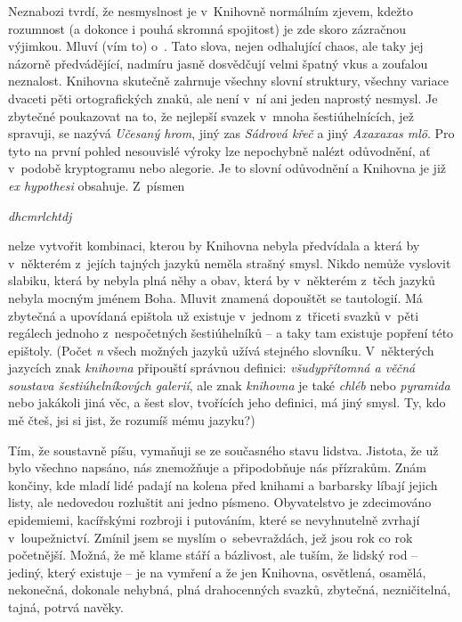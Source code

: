 \documentclass[11pt]{article}
\begin{document}
Neznabozi tvrdí, že nesmyslnost je v~Knihovně normálním zjevem, kdežto rozumnost (a dokonce i pouhá skromná spojitost) je zde skoro zázračnou výjimkou. Mluví (vím to) o~. Tato slova, nejen odhalující chaos, ale taky jej názorně předvádějící, nadmíru jasně dosvědčují velmi špatný vkus a zoufalou neznalost. Knihovna skutečně zahrnuje všechny slovní struktury, všechny variace dvaceti pěti ortografických znaků, ale není v~ní ani jeden naprostý nesmysl. Je zbytečné poukazovat na to, že nejlepší svazek v~mnoha šestiúhelnících, jež spravuji, se nazývá \textit{Učesaný hrom}, jiný zas \textit{Sádrová křeč} a jiný \textit{Axaxaxas mlö}. Pro tyto na první pohled nesouvislé výroky lze nepochybně nalézt odůvodnění, ať v~podobě kryptogramu nebo alegorie. Je to slovní odůvodnění a Knihovna je již \textit{ex hypothesi} obsahuje. Z~písmen
\begin{center}
\textit{dhcmrlchtdj}
\end{center}
\noindent
nelze vytvořit kombinaci, kterou by Knihovna nebyla předvídala a která by v~některém z~jejích tajných jazyků neměla strašný smysl. Nikdo nemůže vyslovit slabiku, která by nebyla plná něhy a obav, která by v~některém z~těch jazyků nebyla mocným jménem Boha. Mluvit znamená dopouštět se tautologií. Má zbytečná a upovídaná epištola už existuje v~jednom z~třiceti svazků v~pěti regálech jednoho z~nespočetných šestiúhelníků -- a taky tam existuje popření této epištoly. (Počet \textit{n} všech možných jazyků užívá stejného slovníku. V~některých jazycích znak \textit{knihovna} připouští správnou definici: \textit{všudypřítomná a věčná soustava šestiúhelníkových galerií}, ale znak \textit{knihovna} je také \textit{chléb} nebo \textit{pyramida} nebo jakákoli jiná věc, a šest slov, tvořících jeho definici, má jiný smysl. Ty, kdo mě čteš, jsi si jist, že rozumíš mému jazyku?)

Tím, že soustavně píšu, vymaňuji se ze současného stavu lidstva. Jistota, že už bylo všechno napsáno, nás znemožňuje a připodobňuje nás přízrakům. Znám končiny, kde mladí lidé padají na kolena před knihami a barbarsky líbají jejich listy, ale nedovedou rozluštit ani jedno písmeno. Obyvatelstvo je zdecimováno epidemiemi, kacířskými rozbroji i putováním, které se nevyhnutelně zvrhají v~loupežnictví. Zmínil jsem se myslím o~sebevraždách, jež jsou rok co rok početnější. Možná, že mě klame stáří a bázlivost, ale tuším, že lidský rod -- jediný, který existuje -- je na vymření a že jen Knihovna, osvětlená, osamělá, nekonečná, dokonale nehybná, plná drahocenných svazků, zbytečná, nezničitelná, tajná, potrvá navěky.
\end{document}
